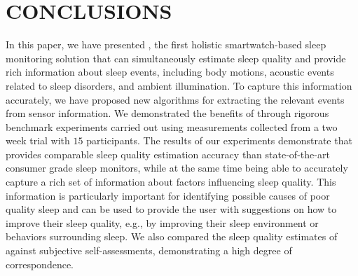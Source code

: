 \section{CONCLUSIONS}
In this paper, we have presented {\systemname}, the first holistic smartwatch-based sleep monitoring solution that can simultaneously estimate sleep quality and provide rich information about sleep events, including body motions, acoustic events related to sleep disorders, and ambient illumination. To capture this information accurately, we have proposed new algorithms for extracting the relevant events from sensor information. We demonstrated the benefits of {\systemname} through rigorous benchmark experiments carried out using measurements collected from a two week trial with $15$ participants. The results of our experiments demonstrate that {\systemname} provides comparable sleep quality estimation accuracy than state-of-the-art consumer grade sleep monitors, while at the same time being able to accurately capture a rich set of information about factors influencing sleep quality. This information is particularly important for identifying possible causes of poor quality sleep and can be used to provide the user with suggestions on how to improve their sleep quality, e.g., by improving their sleep environment or behaviors surrounding sleep. We also compared the sleep quality estimates of {\systemname} against subjective self-assessments, demonstrating a high degree of correspondence.
